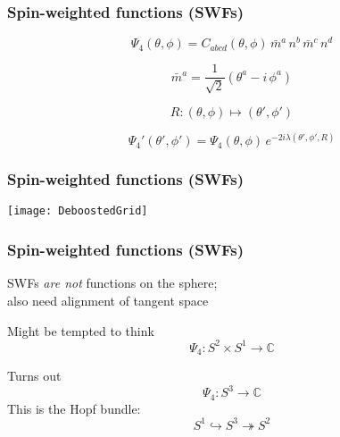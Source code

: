 \documentclass[12pt,xcolor={dvipsnames}]{beamer}
\begin{document}
\begin{frame}
  \frametitle{Spin-weighted functions (SWFs)}
  \begin{equation*}
    \Psi_{4}(\theta, \phi) = C_{abcd}(\theta, \phi)\, \bar{m}^{a}\,
    n^{b}\, \bar{m}^{c}\, n^{d}
  \end{equation*}

  \pause
  \begin{equation*}
    \bar{m}^{a} = \frac{1}{\sqrt{2}} ( \theta^{a} - i\, \phi^{a} )
  \end{equation*}

  \pause
  \vspace{0.2in}
  \begin{equation*}
    R: (\theta, \phi) \mapsto (\theta', \phi')
  \end{equation*}

  \begin{equation*}
    \Psi_{4}'(\theta', \phi') = \Psi_{4}(\theta, \phi)\,
    e^{-2i\lambda(\theta', \phi', R)}
  \end{equation*}
\end{frame}

\begin{frame}
  \frametitle{Spin-weighted functions (SWFs)}
  \begin{center}
    \texttt{[image: DeboostedGrid]}
  \end{center}
\end{frame}

\begin{frame}
  \frametitle{Spin-weighted functions (SWFs)}
  \begin{center}
    SWFs \emph{are not} functions on the sphere; \\[5pt]
    also need alignment of tangent space
  \end{center}
  
  \pause
  \vspace{0.3in}
  Might be tempted to think
  \begin{equation*}
    \Psi_{4} : S^{2} \times S^{1} \to \mathbb{C}
  \end{equation*}

  \pause
  Turns out
  \begin{equation*}
    \Psi_{4} : S^{3} \to \mathbb{C}
  \end{equation*}
  This is the Hopf bundle:
  \begin{equation*}
    S^{1} \hookrightarrow S^{3} \twoheadrightarrow S^{2}
  \end{equation*}
\end{frame}
\end{document}
